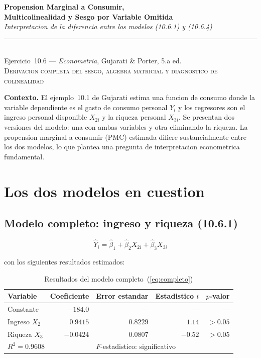 \documentclass[12pt, letterpaper]{article}
\theoremstyle{remark}
\begin{document}
\begin{center}
  {\LARGE\bfseries Propension Marginal a Consumir,}\\[6pt]
  {\LARGE\bfseries Multicolinealidad y Sesgo por Variable Omitida}\\[12pt]
  {\large\itshape Interpretacion de la diferencia entre los modelos (10.6.1) y (10.6.4)}\\[14pt]
  \rule{0.55\linewidth}{0.6pt}\\[8pt]
  {\normalsize Ejercicio~10.6 --- \textit{Econometria}, Gujarati \& Porter, 5.a ed.}\\[4pt]
  {\small\textsc{Derivacion completa del sesgo, algebra matricial y diagnostico de colinealidad}}
\end{center}

\vspace{10pt}

\noindent\textbf{Contexto.}\quad
El ejemplo~10.1 de Gujarati estima una funcion de consumo donde la variable
dependiente es el gasto de consumo personal $Y_i$ y los regresores son el
ingreso personal disponible $X_{2i}$ y la riqueza personal $X_{3i}$. Se
presentan dos versiones del modelo: una con ambas variables y otra eliminando
la riqueza. La propension marginal a consumir (PMC) estimada difiere
sustancialmente entre los dos modelos, lo que plantea una pregunta de
interpretacion econometrica fundamental.

\section{Los dos modelos en cuestion}

\subsection{Modelo completo: ingreso y riqueza (10.6.1)}

\begin{equation}
  \hat{Y}_i = \hat{\beta}_1 + \hat{\beta}_2 X_{2i} + \hat{\beta}_3 X_{3i}
  \label{eq:completo}
\end{equation}

\noindent con los siguientes resultados estimados:

\begin{table}[ht]
\centering
\caption{Resultados del modelo completo~(\ref{eq:completo})}
\label{tab:completo}
\small
\begin{tabular}{lrrrr}
\toprule
\textbf{Variable} & \textbf{Coeficiente} & \textbf{Error estandar}
                  & \textbf{Estadistico $t$} & \textbf{$p$-valor} \\
\midrule
Constante         & $-184.0$  & ---      & ---     & ---    \\
Ingreso $X_2$     & $0.9415$  & $0.8229$ & $1.14$  & $> 0.05$ \\
Riqueza $X_3$     & $-0.0424$ & $0.0807$ & $-0.52$ & $> 0.05$ \\
\midrule
\multicolumn{2}{l}{$R^2 = 0.9608$} & \multicolumn{3}{l}{$F$-estadistico: significativo} \\
\bottomrule
\end{tabular}
\end{table}
\end{document}
